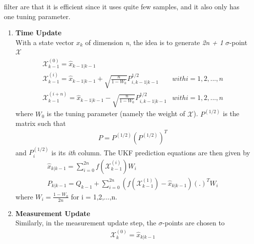 \begin{itemize}
                        filter are that it is efficient since it uses quite few samples, and it also only has one tuning parameter.
                            \begin{enumerate}
                                \item \textbf{Time Update} \\ 
                                    \vspace{3mm}
                                    With a state vector \emph{$x_k$} of dimension \emph{n}, the idea is to generate \emph{2n + 1} $\sigma$-point $\mathcal{X}$
                                    \begin{align}
                                        \mathcal{X}_{k-1}^{(0)} = \hat{x}_{k-1|k-1} \\
                                        \mathcal{X}_{k-1}^{(i)} = \hat{x}_{k-1|k-1} + \sqrt{\frac{n}{1-W_0}} P_{i,k-1|k-1}^{1/2} & with i = 1,2,...,n \\
                                        \mathcal{X}_{k-1}^{(i+n)} = \hat{x}_{k-1|k-1} - \sqrt{\frac{n}{1-W_0}} P_{i,k-1|k-1}^{1/2} & with i = 1,2,...,n 
                                    \end{align}
                                    where \emph{$W_0$} is the tuning parameter (namely the weight of $\mathcal{X}$). \textbf{$P^{(1/2)}$} is the matrix such that
                                    \begin{align}
                                        P = P^{(1/2)} (P^{(1/2)})^T
                                    \end{align}
                                    and \emph{$P_i^(1/2)$} is its \emph{ith} column. The UKF prediction equations are then given by
                                    \begin{align}
                                        \hat{x}_{k|k-1} = \displaystyle\sum_{i=0}^{2n} f(\mathcal{X}_{k-1}^{(i)}) W_i \\
                                        P_{k|k-1} = Q_{k-1} + \displaystyle\sum_{i=0}^{2n} (f(\mathcal{X}_{k-1}^{(1)}) - \hat{x}_{k|k-1}) (.)^T W_i
                                    \end{align} 
                                    where $W_i = \frac{1-W_0}{2n}$ for i = 1,2,...,n.
                                \item \textbf{Measurement Update} \\ 
                                    Similarly, in the measurement update step, the $\sigma$-points are chosen to 
                                    \begin{align}
                                        \mathcal{X}_k^{(0)} = \hat{x}_{k|k-1}
                                    \end{align}
                            \end{enumerate}
        \end{itemize}


